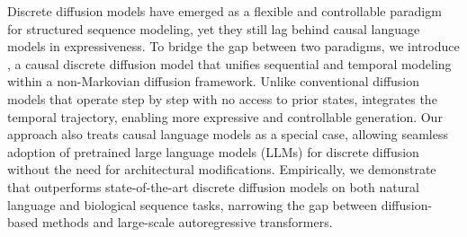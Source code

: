 



Discrete diffusion models have emerged as a flexible and controllable paradigm for structured sequence modeling, yet they still lag behind causal language models in expressiveness. 
To bridge the gap between two paradigms,
we introduce \textbf{\method{}}, a causal discrete diffusion model that unifies sequential and temporal modeling within a non-Markovian diffusion framework. Unlike conventional diffusion models that operate step by step with no access to prior states, \method{} integrates the temporal trajectory, enabling more expressive and controllable generation. Our approach also treats causal language models as a special case, allowing seamless adoption of pretrained large language models (LLMs) for discrete diffusion without the need for architectural modifications. Empirically, we demonstrate that \method{} outperforms state-of-the-art discrete diffusion models on both natural language and biological sequence tasks, narrowing the gap between diffusion-based methods and large-scale autoregressive transformers.





